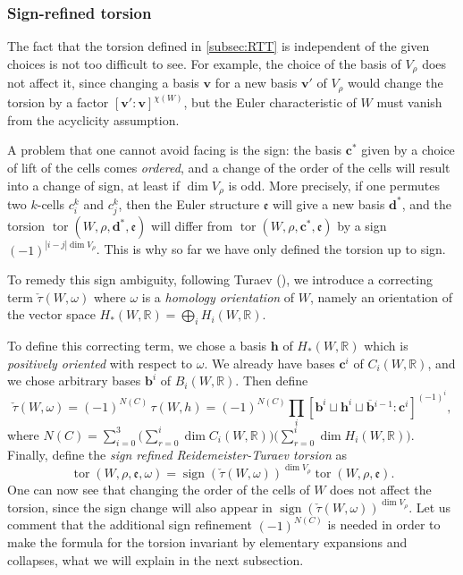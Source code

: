 \documentclass[JEP,XML,SOM,Unicode,NoFloatCountersInSection,published]{cedram}
\theoremstyle{plain}
\theoremstyle{definition}
\theoremstyle{remark}
\newcommand{\R}{\mathbb{R}}
\DeclareMathOperator{\sign}{sign}
\numberwithin{equation}{section}
\DeclareMathOperator{\tor}{tor}
\begin{document}
\subsubsection{Sign-refined torsion}
The fact that the torsion defined in \cref{subsec:RTT} is independent of the given choices is not too difficult to see. For example, the choice of the basis of $V_\rho$ does not affect it, since changing a basis $\boldsymbol v$ for a new basis $\boldsymbol v'$ of $V_\rho$ would change the torsion by a factor $[\boldsymbol v' \colon \boldsymbol v]^{\chi(W)}$, but the Euler characteristic of $W$ must vanish from the acyclicity assumption.

A problem that one cannot avoid facing is the sign: the basis $\boldsymbol c^*$ given by a choice of lift of the cells comes \emph{ordered}, and a change of the order of the cells will result into a change of sign, at least if $\dim V_\rho$ is odd. More precisely, if one permutes two $k$-cells $c^k_i$ and $c^k_j$, then the Euler structure $\mathfrak e$ will give a new basis $\boldsymbol d^*$, and the torsion $\tor(W, \rho, \boldsymbol d^*, \mathfrak e)$ will differ from $\tor(W, \rho, \boldsymbol c^*, \mathfrak e)$ by a sign $(-1)^{|i-j| \dim V_\rho}$. This is why so far we have only defined the torsion up to sign.

To remedy this sign ambiguity, following Turaev (\cite[Ch.\,III, \S 18]{Turaev_book}), we introduce a correcting term $\check \tau(W, \omega)$ where $\omega$ is a \emph{homology orientation} of $W$, namely an orientation of the vector space $H_*(W, \R) = \bigoplus_i H_i(W, \R)$.

To define this correcting term, we chose a basis $\boldsymbol h$ of $H_*(W, \R)$ which is \emph{positively oriented} with respect to $\omega$. We already have bases $\boldsymbol c^i$ of $C_i(W, \R)$, and we chose arbitrary bases $\boldsymbol b^i$ of $B_i(W, \R)$. Then define
\[
\check \tau(W, \omega) = (-1)^{N(C)} \, \tau(W, h) = (-1)^{N(C)} \prod_i [\boldsymbol b^i \sqcup \boldsymbol h^i \sqcup \boldsymbol{\overline b}{}^{i-1} \colon \boldsymbol{c}^i]^{(-1)^i},
\]
where $N(C) = \sum_{i=0}^3 \bigl(\sum_{r=0}^i \dim C_i(W, \R)\bigr)\bigl(\sum_{r=0}^i \dim H_i(W, \R)\bigr)$.
Finally, define the \emph{sign refined Reidemeister-Turaev torsion} as
\[
\tor(W,\rho, \mathfrak e, \omega) = \sign(\check \tau(W, \omega))^{\dim V_\rho} \tor(W, \rho, \mathfrak e).
\]
One can now see that changing the order of the cells of $W$ does not affect the torsion, since the sign change will also appear in $\sign(\check \tau(W, \omega))^{\dim V_\rho}$. Let us comment that the additional sign refinement $(-1)^{N(C)}$ is needed in order to make the formula for the torsion invariant by elementary expansions and collapses, what we will explain in the next subsection.
\end{document}
